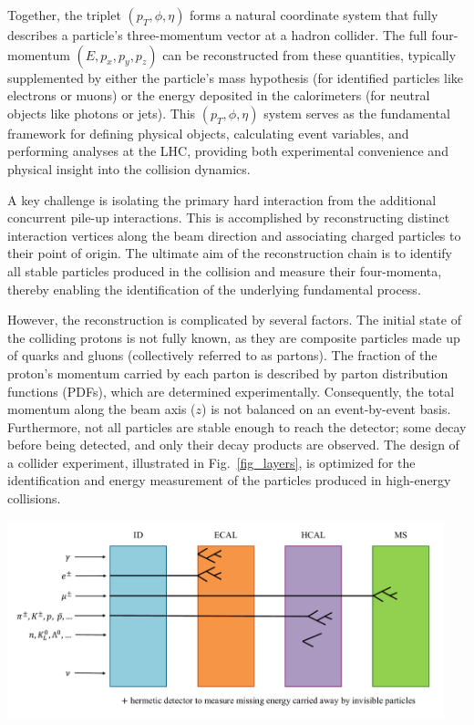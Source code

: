 Together, the triplet $(p_T, \phi, \eta)$ forms a natural coordinate system that fully describes a particle's three-momentum vector at a hadron collider. The full four-momentum $(E, p_x, p_y, p_z)$ can be reconstructed from these quantities, typically supplemented by either the particle's mass hypothesis (for identified particles like electrons or muons) or the energy deposited in the calorimeters (for neutral objects like photons or jets). This $(p_T, \phi, \eta)$ system serves as the fundamental framework for defining physical objects, calculating event variables, and performing analyses at the LHC, providing both experimental convenience and physical insight into the collision dynamics.


A key challenge is isolating the primary hard interaction from the additional concurrent pile-up interactions. This is accomplished by reconstructing distinct interaction vertices along the beam direction and associating charged particles to their point of origin. The ultimate aim of the reconstruction chain is to identify all stable particles produced in the collision and measure their four-momenta, thereby enabling the identification of the underlying fundamental process.

However, the reconstruction is complicated by several factors. The initial state of the colliding protons is not fully known, as they are composite particles made up of quarks and gluons (collectively referred to as partons). The fraction of the proton's momentum carried by each parton is described by parton distribution functions (PDFs), which are determined experimentally. Consequently, the total momentum along the beam axis ($z$) is not balanced on an event-by-event basis. Furthermore, not all particles are stable enough to reach the detector; some decay before being detected, and only their decay products are observed. The design of a collider experiment, illustrated in Fig.~\ref{fig_layers}, is optimized for the identification and energy measurement of the particles produced in high-energy collisions.

\begin{center}
    \includegraphics[width=0.95\textwidth]{Images/Layers.pdf}
    \label{fig_layers}
\end{center}

